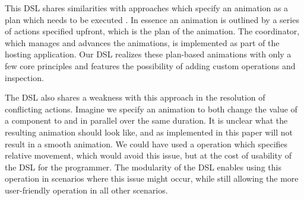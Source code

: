 This DSL shares similarities with approaches which specify an animation as a plan which needs to be executed \cite{DBLP:conf/chi/KurlanderL95} \cite{DBLP:conf/eics/MirlacherPB12}. In essence an animation is outlined by a series of actions specified upfront, which is the plan of the animation. The coordinator, which manages and advances the animations, is implemented as part of the hosting application. Our DSL realizes these plan-based animations with only a few core principles and features the possibility of adding custom operations and inspection.

The DSL also shares a weakness with this approach in the resolution of conflicting actions. Imagine we specify an animation to both change the  value of a component to  and  in parallel over the same duration. It is unclear what the resulting animation should look like, and as implemented in this paper will not result in a smooth animation. We could have used a  operation which specifies relative movement, which would avoid this issue, but at the cost of usability of the DSL for the programmer. The modularity of the DSL enables using this operation in scenarios where this issue might occur, while still allowing the more user-friendly operation in all other scenarios.
